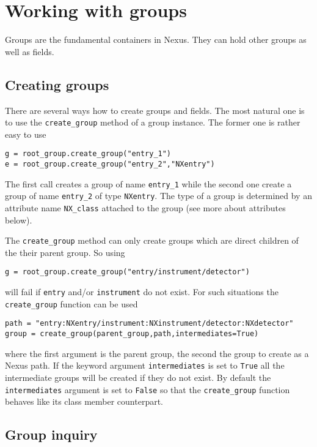\section{Working with groups}

Groups are the fundamental containers in Nexus. They can hold other groups as
well as fields. 

\subsection{Creating groups}
There are several ways how to create groups and fields. The most natural one is
to use the {\tt create\_group} method of a group instance. 
The former one is rather easy to use
\begin{verbatim}
g = root_group.create_group("entry_1")
e = root_group.create_group("entry_2","NXentry")
\end{verbatim}
The first call creates a group of name {\tt entry\_1} while the second 
one create a group of name {\tt entry\_2} of type {\tt NXentry}. 
The type of a group is determined by an attribute name {\tt NX\_class}
attached to the group (see more about attributes below).

The {\tt create\_group} method can only create groups which are direct
children of the their parent group. So using 
\begin{verbatim}
g = root_group.create_group("entry/instrument/detector")
\end{verbatim}
will fail if {\tt entry} and/or {\tt instrument} do not exist. 
For such situations the {\tt create\_group} function can be used
\begin{verbatim}
path = "entry:NXentry/instrument:NXinstrument/detector:NXdetector"
group = create_group(parent_group,path,intermediates=True)
\end{verbatim}
where the first argument is the parent group, the second the group to create
as a Nexus path. If the keyword argument {\tt intermediates} is set to
{\tt True} all the intermediate groups will be created if they do not exist. 
By default the {\tt intermediates} argument is set to {\tt False} 
so that the {\tt create\_group} function behaves like its class member 
counterpart.

\subsection{Group inquiry}

